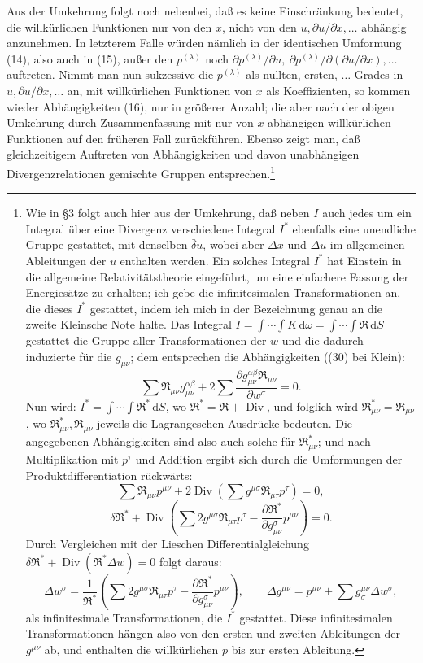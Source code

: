 \documentclass[11pt]{article}
\newcommand{\dd}{\mathrm d}
\newcommand{\Div}{\operatorname{Div}}
\newcommand{\D}{\Delta}
\newcommand{\bd}{\bar{\delta}}
\newcommand{\p}{\partial}
\begin{document}
Aus der Umkehrung folgt noch nebenbei, daß es keine Einschränkung bedeutet, die willkürlichen Funktionen nur von den \(x\), nicht von den \(u,\p u/\p x,\ldots\) abhängig anzunehmen. In letzterem Falle würden nämlich in der identischen Umformung (14), also auch in (15), außer den \(p^{(\lambda)}\) noch \(\p p^{(\lambda)}/\p u,\ \p p^{(\lambda)}/\p(\p u/\p x),\ldots\) auftreten. Nimmt man nun sukzessive die \(p^{(\lambda)}\) als nullten, ersten, \(\ldots\) Grades in \(u,\p u/\p x,\ldots\) an, mit willkürlichen Funktionen von \(x\) als Koeffizienten, so kommen wieder Abhängigkeiten (16), nur in größerer Anzahl; die aber nach der obigen Umkehrung durch Zusammenfassung mit nur von \(x\) abhängigen willkürlichen Funktionen auf den früheren Fall zurückführen. Ebenso zeigt man, daß gleichzeitigem Auftreten von Abhängigkeiten und davon unabhängigen Divergenzrelationen gemischte Gruppen entsprechen.\footnote{Wie in \S{}3 folgt auch hier aus der Umkehrung, daß neben \(I\) auch jedes um ein Integral über eine Divergenz verschiedene Integral \(I^*\) ebenfalls eine unendliche Gruppe gestattet, mit denselben \(\bd u\), wobei aber \(\D x\) und \(\D u\) im allgemeinen Ableitungen der \(u\) enthalten werden. Ein solches Integral \(I^*\) hat Einstein in die allgemeine Relativitätstheorie eingeführt, um eine einfachere Fassung der Energiesätze zu erhalten; ich gebe die infinitesimalen Transformationen an, die dieses \(I^*\) gestattet, indem ich mich in der Bezeichnung genau an die zweite Kleinsche Note halte. Das Integral \(I=\int\!\cdots\!\int K\,\dd\omega=\int\!\cdots\!\int \mathfrak{R}\,\dd S\) gestattet die Gruppe aller Transformationen der \(w\) und die dadurch induzierte für die \(g_{\mu\nu}\); dem entsprechen die Abhängigkeiten ((30) bei Klein):
\[
\sum \mathfrak{R}_{\mu\nu}g_{\mu\nu}^{\alpha\beta}
+2\sum\frac{\p g_{\mu\nu}^{\alpha\beta}\mathfrak{R}_{\mu\nu}}{\p w^\sigma}=0.
\]
Nun wird: \(I^*=\int\!\cdots\!\int \mathfrak{R}^*\,\dd S\), wo \(\mathfrak{R}^*=\mathfrak{R}+\Div\), und folglich wird \(\mathfrak{R}_{\mu\nu}^*=\mathfrak{R}_{\mu\nu}\), wo \(\mathfrak{R}_{\mu\nu}^*,\mathfrak{R}_{\mu\nu}\) jeweils die Lagrangeschen Ausdrücke bedeuten. Die angegebenen Abhängigkeiten sind also auch solche für \(\mathfrak{R}_{\mu\nu}^*\); und nach Multiplikation mit \(p^\tau\) und Addition ergibt sich durch die Umformungen der Produktdifferentiation rückwärts:
\[
\sum \mathfrak{R}_{\mu\nu}p^{\mu\nu}
+2\Div\!\left(\sum g^{\mu\sigma}\mathfrak{R}_{\mu\tau}p^\tau\right)=0,
\]
\[
\delta\mathfrak{R}^*+\Div\!\left(\sum 2g^{\mu\sigma}\mathfrak{R}_{\mu\tau}p^\tau
-\frac{\p\mathfrak{R}^*}{\p g_{\mu\nu}^{\sigma}}p^{\mu\nu}\right)=0.
\]
Durch Vergleichen mit der Lieschen Differentialgleichung
\(\delta\mathfrak{R}^*+\Div(\mathfrak{R}^*\D w)=0\) folgt daraus:
\[
\D w^\sigma=\frac1{\mathfrak{R}^*}\left(\sum 2g^{\mu\sigma}\mathfrak{R}_{\mu\tau}p^\tau
-\frac{\p\mathfrak{R}^*}{\p g_{\mu\nu}^{\sigma}}p^{\mu\nu}\right),
\qquad
\D g^{\mu\nu}=p^{\mu\nu}+\sum g^{\mu\nu}_{\sigma}\D w^\sigma,
\]
als infinitesimale Transformationen, die \(I^*\) gestattet. Diese infinitesimalen Transformationen hängen also von den ersten und zweiten Ableitungen der \(g^{\mu\nu}\) ab, und enthalten die willkürlichen \(p\) bis zur ersten Ableitung.}
\end{document}
